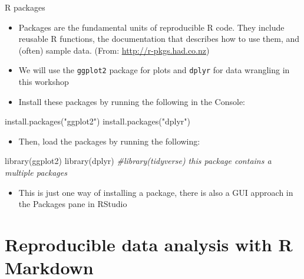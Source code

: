 \documentclass[
  ignorenonframetext,
]{beamer}
\newenvironment{Shaded}{\begin{snugshade}}{\end{snugshade}}
\newcommand{\CommentTok}[1]{\textcolor[rgb]{0.56,0.35,0.01}{\textit{#1}}}
\newcommand{\FunctionTok}[1]{\textcolor[rgb]{0.00,0.00,0.00}{#1}}
\newcommand{\NormalTok}[1]{#1}
\newcommand{\StringTok}[1]{\textcolor[rgb]{0.31,0.60,0.02}{#1}}
\providecommand{\tightlist}{%
  \setlength{\itemsep}{0pt}\setlength{\parskip}{0pt}}
\begin{document}
\begin{frame}[fragile]{R packages}
\protect\hypertarget{r-packages}{}
\begin{itemize}
\item
  Packages are the fundamental units of reproducible R code. They
  include reusable R functions, the documentation that describes how to
  use them, and (often) sample data. (From:
  \url{http://r-pkgs.had.co.nz})
\item
  We will use the \texttt{ggplot2} package for plots and \texttt{dplyr}
  for data wrangling in this workshop
\item
  Install these packages by running the following in the Console:
\end{itemize}

\begin{Shaded}
\begin{Highlighting}[]
\FunctionTok{install.packages}\NormalTok{(}\StringTok{"ggplot2"}\NormalTok{)}
\FunctionTok{install.packages}\NormalTok{(}\StringTok{"dplyr"}\NormalTok{)}
\end{Highlighting}
\end{Shaded}

\begin{itemize}
\tightlist
\item
  Then, load the packages by running the following:
\end{itemize}

\begin{Shaded}
\begin{Highlighting}[]
\FunctionTok{library}\NormalTok{(ggplot2)}
\FunctionTok{library}\NormalTok{(dplyr)}
\CommentTok{\#library(tidyverse) this package contains a multiple packages }
\end{Highlighting}
\end{Shaded}

\begin{itemize}
\tightlist
\item
  This is just one way of installing a package, there is also a GUI
  approach in the Packages pane in RStudio
\end{itemize}
\end{frame}

\hypertarget{reproducible-data-analysis-with-r-markdown}{%
\section{Reproducible data analysis with R
Markdown}\label{reproducible-data-analysis-with-r-markdown}}
\end{document}
